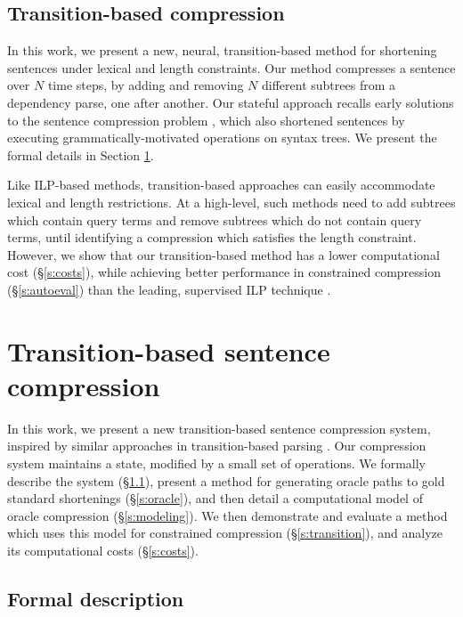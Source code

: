 \documentclass[11pt,a4paper]{article}
\begin{document}
\subsection{Transition-based compression}

In this work, we present a new, neural, transition-based method for shortening sentences under lexical and length constraints. Our method compresses a sentence over $N$ time steps, by adding and removing $N$ different subtrees from a dependency parse, one after another. Our stateful approach recalls early solutions to the sentence compression problem \cite{Jing2000SentenceRF,Knight2000StatisticsBasedS}, which also shortened sentences by executing grammatically-motivated operations on syntax trees. We present the formal details in Section \ref{s:system}. 

Like ILP-based methods, transition-based approaches can easily accommodate lexical and length restrictions. At a high-level, such methods need to add subtrees which contain query terms and remove subtrees which do not contain query terms, until identifying a compression which satisfies the length constraint. However, we show that our transition-based method has a lower computational cost (\S\ref{s:costs}), while achieving better performance in constrained compression (\S\ref{s:autoeval}) than the leading, supervised ILP technique \cite{filippova2013overcoming}.

\section{Transition-based sentence compression}\label{s:system}

In this work, we present a new transition-based sentence compression system, inspired by similar approaches in transition-based parsing \cite{nivre2003,D14-1082}. Our compression system maintains a state, modified by a small set of operations. We formally describe the system (\S\ref{s:formal}), present a method for generating oracle paths to gold standard shortenings (\S\ref{s:oracle}), and then detail a computational model of oracle compression (\S\ref{s:modeling}). We then demonstrate and evaluate a method which uses this model for constrained compression (\S\ref{s:transition}), and analyze its computational costs (\S\ref{s:costs}).

\subsection{Formal description}\label{s:formal}
\end{document}
